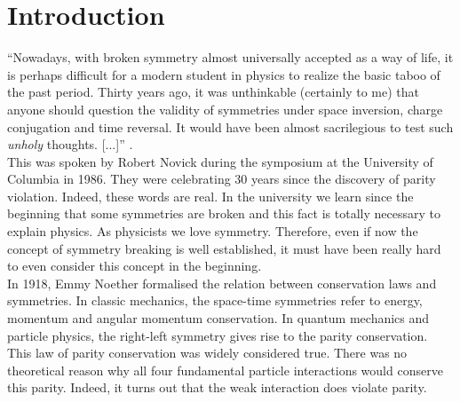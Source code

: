 \documentclass[10pt,swedish, openany]{book}
\begin{document}
\clearpage


\mainmatter

\chapter{Introduction}
\label{chapter:Introduction}

``Nowadays, with broken symmetry almost universally accepted as a way of life, it is perhaps difficult for a modern student in physics to realize the basic taboo of the past period. Thirty years ago, it was unthinkable (certainly to me) that anyone should question the validity of symmetries under space inversion, charge conjugation and time reversal. It would have been almost sacrilegious to test such \emph{unholy} thoughts. [...]'' \cite{violation}. \\

This was spoken by Robert Novick during the symposium at the University of Columbia in 1986. They were celebrating 30 years since the discovery of parity violation. Indeed, these words are real. In the university we learn since the beginning that some symmetries are broken and this fact is totally necessary to explain physics. As physicists we love symmetry. Therefore, even if now the concept of symmetry breaking is well established, it must have been really hard to even consider this concept in the beginning.\\

In 1918, Emmy Noether formalised the relation between conservation laws and symmetries. In classic mechanics, the space-time symmetries refer to energy, momentum and angular momentum conservation. In quantum mechanics and particle physics, the right-left symmetry gives rise to the parity conservation. This law of parity conservation was widely considered true. There was no theoretical reason why all four fundamental particle interactions would conserve this parity. Indeed, it turns out that the weak interaction does violate parity. \\
\end{document}
